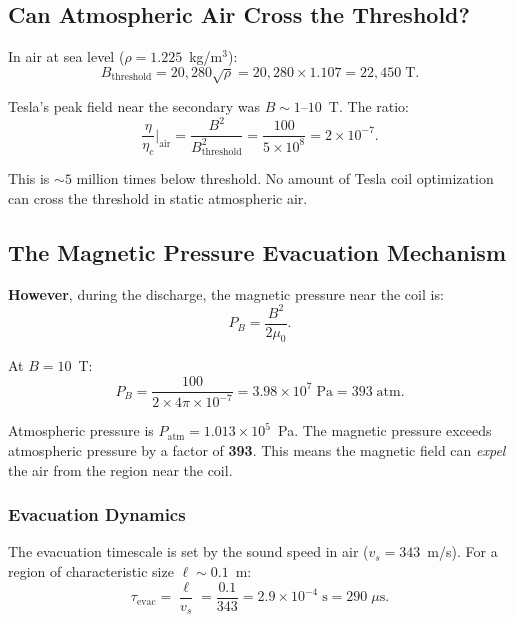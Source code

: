 \documentclass[11pt,a4paper]{article}
\begin{document}
\subsection{Can Atmospheric Air Cross the Threshold?}

In air at sea level ($\rho = 1.225$~kg/m$^3$):
\begin{equation}
B_{\mathrm{threshold}} = 20{,}280\sqrt{\rho} = 20{,}280 \times 1.107
= 22{,}450\;\mathrm{T}.
\end{equation}

Tesla's peak field near the secondary was $B \sim 1$--$10$~T. The ratio:
\begin{equation}
\frac{\eta}{\eta_c}\bigg|_{\mathrm{air}} = \frac{B^2}{B_{\mathrm{threshold}}^2}
= \frac{100}{5 \times 10^8} = 2 \times 10^{-7}.
\end{equation}

This is $\sim 5$ million times below threshold. No amount of Tesla coil optimization
can cross the threshold in static atmospheric air.

\subsection{The Magnetic Pressure Evacuation Mechanism}

\textbf{However}, during the discharge, the magnetic pressure near the coil is:
\begin{equation}
P_B = \frac{B^2}{2\mu_0}.
\end{equation}

At $B = 10$~T:
\begin{equation}
P_B = \frac{100}{2 \times 4\pi \times 10^{-7}} = 3.98 \times 10^7\;\mathrm{Pa} = 393\;\mathrm{atm}.
\end{equation}

Atmospheric pressure is $P_{\mathrm{atm}} = 1.013 \times 10^5$~Pa. The magnetic
pressure exceeds atmospheric pressure by a factor of \textbf{393}. This means the
magnetic field can \emph{expel} the air from the region near the coil.

\subsubsection{Evacuation Dynamics}

The evacuation timescale is set by the sound speed in air ($v_s = 343$~m/s).
For a region of characteristic size $\ell \sim 0.1$~m:
\begin{equation}
\tau_{\mathrm{evac}} = \frac{\ell}{v_s} = \frac{0.1}{343} = 2.9 \times 10^{-4}\;\mathrm{s} = 290\;\mu\mathrm{s}.
\end{equation}
\end{document}
